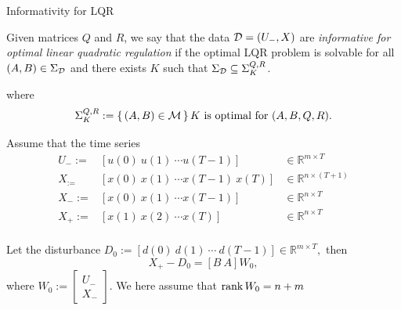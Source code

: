 \documentclass[aspectratio=169, handout, 10pt, hyperref=colorlinks]{beamer}
\begin{document}
\begin{frame}{Informativity for LQR}
\begin{definition}
    Given matrices $Q$ and $R$, we say that the data $\mathcal{D} = (U_-,X)$ are \emph{informative for optimal linear quadratic regulation} if the optimal LQR problem is solvable for all $(A,B) \in \Sigma_{\mathcal{D}} $ and there exists $K$ such that $\Sigma_{\mathcal{D}} \subseteq \Sigma^{Q,R}_{K}$.

    where
    \[ 
    \Sigma_K^{Q,R}:=\set{(A,B) \in \ensuremath{\mathcal{M}}}{K \text{ is optimal for }(A,B,Q,R)}.
    \]
\end{definition}


\end{frame}
\begin{frame}{}
Assume that the time series
\begin{align}
U_-:=&[u(0)\ u(1)\ \cdots u(T-1)]&\in \mathbb{R}^{m\times T}\\
X_:=&[x(0)\ x(1)\ \cdots x(T-1)\ x(T)] &\in \mathbb{R}^{n\times (T+1)}\\
X_-:=&[x(0)\ x(1)\ \cdots x(T-1)] &\in \mathbb{R}^{n\times T}\\
X_+:=&[x(1)\ x(2)\ \cdots x(T)] &\in \mathbb{R}^{n\times T}\\
\end{align}


Let the disturbance $D_0:=[d(0)\ d(1)\ \cdots\ d(T-1)]\in \mathbb{R}^{m\times T},$ then
\[
 X_+-D_0 = [B\ A]W_0,
\]
where
$W_0:=\begin{bmatrix} U_- \\ X_- \end{bmatrix}$.
We here assume that ${\rm rank}\, W_0 = n+m$
\end{frame}
\end{document}
